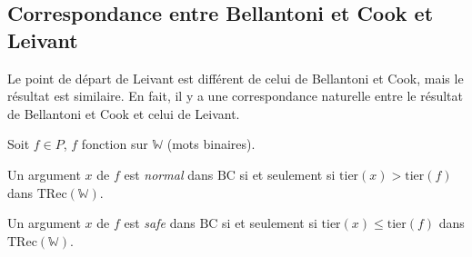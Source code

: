 \documentclass{report}
\newcommand{\TRec}[1]{\text{TRec}\left(\mathbb{#1}\right)}
\begin{document}
		
	
		\subsection{Correspondance entre Bellantoni et Cook et Leivant}
		\label{subsec:corres_BC_Leivant}
	
			Le point de départ de Leivant est différent de celui de Bellantoni et Cook, mais le résultat est similaire. En fait, il y a une correspondance naturelle entre le résultat de Bellantoni et Cook et celui de Leivant.
			
			\begin{lemma}
				\label{lem:BC_and_Leivant}
				Soit $f \in P$, $f$ fonction sur $\mathbb{W}$ (mots binaires).
				
				Un argument $x$ de $f$ est \emph{normal} dans $\text{BC}$ si et seulement si $\text{tier}(x) > \text{tier}(f)$ dans $\TRec{W}$.
				
				Un argument $x$ de $f$ est \emph{safe} dans $\text{BC}$ si et seulement si $\text{tier}(x) \leq \text{tier}(f)$ dans $\TRec{W}$.
			\end{lemma}
			
\end{document}
